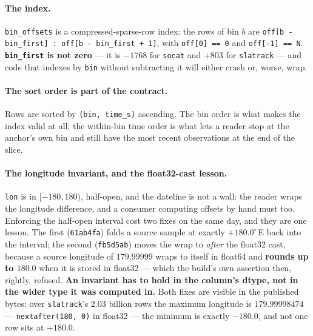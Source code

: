 \documentclass[10pt]{article}
\newcommand{\code}[1]{\texttt{#1}}
\begin{document}
\paragraph{The index.} \code{bin\_offsets} is a compressed-sparse-row index:
the rows of bin $b$ are \code{off[b - bin\_first] : off[b - bin\_first + 1]},
with \code{off[0] == 0} and \code{off[-1] == N}. \textbf{\code{bin\_first} is
not zero} --- it is $-1768$ for \code{socat} and $+803$ for \code{slatrack} ---
and code that indexes by \code{bin} without subtracting it will either crash
or, worse, wrap.

\paragraph{The sort order is part of the contract.} Rows are sorted by
\code{(bin, time\_s)} ascending. The bin order is what makes the index valid
at all; the within-bin time order is what lets a reader stop at the anchor's own
bin and still have the most recent observations at the end of the slice.

\paragraph{The longitude invariant, and the float32-cast lesson.} \code{lon}
is in $[-180, 180)$, half-open, and the dateline is not a wall: the reader wraps
the longitude difference, and a consumer computing offsets by hand must too.
Enforcing the half-open interval cost two fixes on the same day, and they are
one lesson. The first (\code{61ab4fa}) folds a source sample at exactly
$+180.0^\circ$\,E back into the interval; the second (\code{fb5d5ab}) moves the
wrap to \emph{after} the float32 cast, because a source longitude of
$179.99999$ wraps to itself in float64 and \textbf{rounds up to $180.0$} when it
is stored in float32 --- which the build's own assertion then, rightly, refused.
\textbf{An invariant has to hold in the column's dtype, not in the wider type it
was computed in.} Both fixes are visible in the published bytes: over
\code{slatrack}'s 2.03 billion rows the maximum longitude is $179.99998474$ ---
\code{nextafter(180, 0)} in float32 --- the minimum is exactly $-180.0$, and not
one row sits at $+180.0$.
\end{document}
